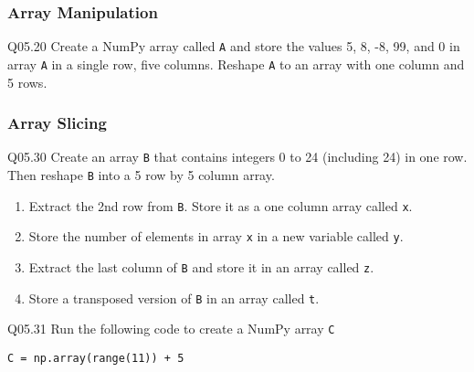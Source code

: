 \documentclass{book}
\newcommand{\passthrough}[1]{#1}
\begin{document}
    




    
        \hypertarget{array-manipulation}{%
\subsubsection{Array Manipulation}\label{array-manipulation}}
    




    
        Q05.20 Create a NumPy array called \passthrough{\lstinline!A!} and store
the values 5, 8, -8, 99, and 0 in array \passthrough{\lstinline!A!} in a
single row, five columns. Reshape \passthrough{\lstinline!A!} to an
array with one column and 5 rows.
    




    
        \hypertarget{array-slicing}{%
\subsubsection{Array Slicing}\label{array-slicing}}
    




    
        Q05.30 Create an array \passthrough{\lstinline!B!} that contains
integers 0 to 24 (including 24) in one row. Then reshape
\passthrough{\lstinline!B!} into a 5 row by 5 column array.

\begin{enumerate}
\def\labelenumi{(\alph{enumi})}
\item
  Extract the 2nd row from \passthrough{\lstinline!B!}. Store it as a
  one column array called \passthrough{\lstinline!x!}.
\item
  Store the number of elements in array \passthrough{\lstinline!x!} in a
  new variable called \passthrough{\lstinline!y!}.
\item
  Extract the last column of \passthrough{\lstinline!B!} and store it in
  an array called \passthrough{\lstinline!z!}.
\item
  Store a transposed version of \passthrough{\lstinline!B!} in an array
  called \passthrough{\lstinline!t!}.
\end{enumerate}

Q05.31 Run the following code to create a NumPy array
\passthrough{\lstinline!C!}

\passthrough{\lstinline!C = np.array(range(11)) + 5!}
\end{document}
